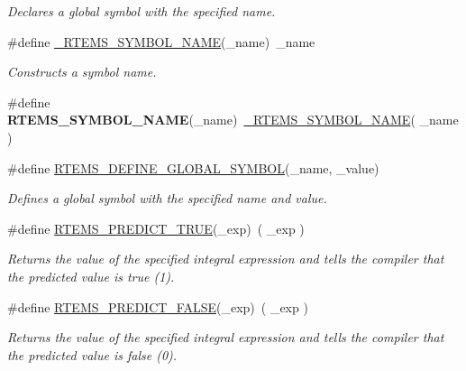 \begin{DoxyCompactItemize}
\begin{DoxyCompactList}\small\item\em Declares a global symbol with the specified name. \end{DoxyCompactList}\item 
\#define \mbox{\hyperlink{group__RTEMSScoreBaseDefs_ga637940aa2edf2a7dab2894ee8bc1a50d}{\+\_\+\+R\+T\+E\+M\+S\+\_\+\+S\+Y\+M\+B\+O\+L\+\_\+\+N\+A\+ME}}(\+\_\+name)~\+\_\+name
\begin{DoxyCompactList}\small\item\em Constructs a symbol name. \end{DoxyCompactList}\item 
\mbox{\label{group__RTEMSScoreBaseDefs_ga0168ff705d938b77e18c9aaaab0164f3}} 
\#define {\bfseries R\+T\+E\+M\+S\+\_\+\+S\+Y\+M\+B\+O\+L\+\_\+\+N\+A\+ME}(\+\_\+name)~\mbox{\hyperlink{group__RTEMSScoreBaseDefs_ga637940aa2edf2a7dab2894ee8bc1a50d}{\+\_\+\+R\+T\+E\+M\+S\+\_\+\+S\+Y\+M\+B\+O\+L\+\_\+\+N\+A\+ME}}( \+\_\+name )
\item 
\#define \mbox{\hyperlink{group__RTEMSScoreBaseDefs_ga8737de0ec5337676087c74b78b575706}{R\+T\+E\+M\+S\+\_\+\+D\+E\+F\+I\+N\+E\+\_\+\+G\+L\+O\+B\+A\+L\+\_\+\+S\+Y\+M\+B\+OL}}(\+\_\+name,  \+\_\+value)
\begin{DoxyCompactList}\small\item\em Defines a global symbol with the specified name and value. \end{DoxyCompactList}\item 
\#define \mbox{\hyperlink{group__RTEMSScoreBaseDefs_gaa1996ef46facf329baf06d7f3276829f}{R\+T\+E\+M\+S\+\_\+\+P\+R\+E\+D\+I\+C\+T\+\_\+\+T\+R\+UE}}(\+\_\+exp)~( \+\_\+exp )
\begin{DoxyCompactList}\small\item\em Returns the value of the specified integral expression and tells the compiler that the predicted value is true (1). \end{DoxyCompactList}\item 
\#define \mbox{\hyperlink{group__RTEMSScoreBaseDefs_ga5cc847904bc4f2755ce665a20adb4b2c}{R\+T\+E\+M\+S\+\_\+\+P\+R\+E\+D\+I\+C\+T\+\_\+\+F\+A\+L\+SE}}(\+\_\+exp)~( \+\_\+exp )
\begin{DoxyCompactList}\small\item\em Returns the value of the specified integral expression and tells the compiler that the predicted value is false (0). \end{DoxyCompactList}\item 

\end{DoxyCompactItemize}

